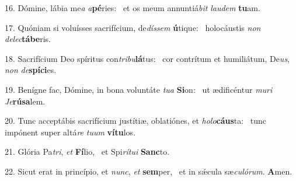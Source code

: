 16. Dómine, lábia me\textit{a} \textit{a}\textbf{pé}ries: \ast\  et os meum annuntiá\textit{bit} \textit{lau}\textit{dem} \textbf{tu}am.\

17. Quóniam si voluísses sacrifícium, de\textit{dís}\textit{sem} \textbf{ú}tique: \ast\  holocáustis \textit{non} \textit{de}\textit{lec}\textbf{tá}\textbf{be}ris.\

18. Sacrifícium Deo spíritus con\textit{tri}\textit{bu}\textbf{lá}tus: \ast\  cor contrítum et humiliátum, De\textit{us}, \textit{non} \textit{de}\textbf{spí}\textbf{ci}es.\

19. Benígne fac, Dómine, in bona voluntáte \textit{tu}\textit{a} \textbf{Si}on: \ast\  ut ædificéntur \textit{mu}\textit{ri} \textit{Je}\textbf{rú}\textbf{sa}lem.\

20. Tunc acceptábis sacrifícium justítiæ, oblatiónes, et \textit{ho}\textit{lo}\textbf{cáus}ta: \ast\  tunc impónent super altá\textit{re} \textit{tu}\textit{um} \textbf{ví}\textbf{tu}los.\

21. Glória Pa\textit{tri}, \textit{et} \textbf{Fí}lio, \ast\  et Spi\textit{rí}\textit{tu}\textit{i} \textbf{Sanc}to.\

22. Sicut erat in princípio, et \textit{nunc}, \textit{et} \textbf{sem}per, \ast\  et in sǽcula sæ\textit{cu}\textit{ló}\textit{rum}. \textbf{A}men.\

